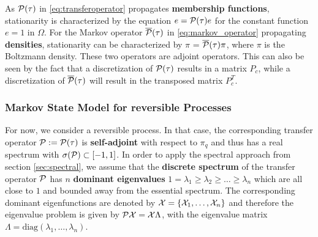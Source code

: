 As $\mathcal{P}(\tau)$ in \eqref{eq:transferoperator} propagates \textbf{membership functions}, stationarity is characterized by the equation $e=\mathcal{P}(\tau)e$ for the constant function $e = 1$ in $\Omega$. For the Markov operator $\overline{\mathcal{P}} (\tau) $ in \eqref{eq:markov_operator} propagating \textbf{densities}, stationarity can be characterized by $\pi$ = $\overline{\mathcal{P}} (\tau) \pi$, where $\pi$ is the Boltzmann density. %
These two operators are adjoint operators. This can also be seen by the fact that a discretization of $\mathcal{P}(\tau)$ results in a matrix $P_c$, while a discretization of $\overline{\mathcal{P}} (\tau)$ will result in the transposed matrix $P_c^T$.


\subsubsection*{Markov State Model for reversible Processes}

For now, we consider a reversible process. In that case, the corresponding transfer operator $\mathcal{P} := \mathcal{P}(\tau)$ is \textbf{self-adjoint} with respect to $\pi_q$ and thus has a real spectrum with $\sigma(\mathcal{P}) \subset [-1,1]$. %
In order to apply the spectral approach from section \ref{sec:spectral}, we assume that the \textbf{discrete spectrum} of the transfer operator $\mathcal{P}$ has $n$ \textbf{dominant eigenvalues} $1 = \lambda_1 \geq \lambda_2 \geq \dots \geq \lambda_n$ which are all close to $1$ and bounded away from the essential spectrum.
The corresponding dominant eigenfunctions are denoted by $\mathcal{X} = \{ \mathcal{X}_1,\dots, \mathcal{X}_n\}$ and therefore the eigenvalue problem is given by $\mathcal{P} \mathcal{X} = \mathcal{X} \Lambda$, with the eigenvalue matrix $\Lambda = \mathrm{diag}(\lambda_1, \dots, \lambda_n)$.


